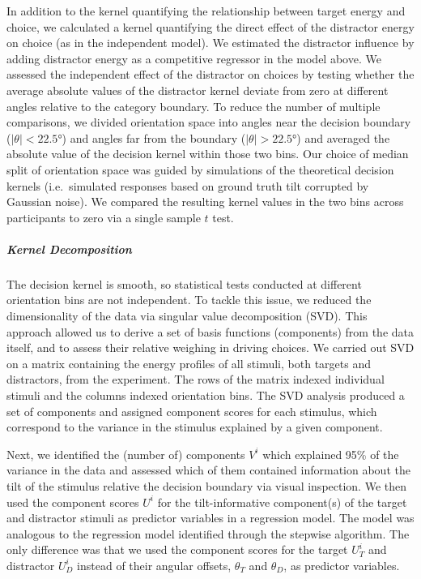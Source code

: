 \documentclass[a4paper, nobind]{templates/ociamthesis}
\begin{document}
In addition to the kernel quantifying the relationship between target energy and choice, we calculated a kernel quantifying the direct effect of the distractor energy on choice (as in the independent model). We estimated the distractor influence by adding distractor energy as a competitive regressor in the model above. We assessed the independent effect of the distractor on choices by testing whether the average absolute values of the distractor kernel deviate from zero at different angles relative to the category boundary. To reduce the number of multiple comparisons, we divided orientation space into angles near the decision boundary (\(|\theta|<22.5\)°) and angles far from the boundary (\(|\theta|>22.5\)°) and averaged the absolute value of the decision kernel within those two bins. Our choice of median split of orientation space was guided by simulations of the theoretical decision kernels (i.e.~simulated responses based on ground truth tilt corrupted by Gaussian noise). We compared the resulting kernel values in the two bins across participants to zero via a single sample \(t\) test.

\hypertarget{kernel-decomposition}{%
\subparagraph{Kernel Decomposition}\label{kernel-decomposition}}

The decision kernel is smooth, so statistical tests conducted at different orientation bins are not independent. To tackle this issue, we reduced the dimensionality of the data via singular value decomposition (SVD). This approach allowed us to derive a set of basis functions (components) from the data itself, and to assess their relative weighing in driving choices. We carried out SVD on a matrix containing the energy profiles of all stimuli, both targets and distractors, from the experiment. The rows of the matrix indexed individual stimuli and the columns indexed orientation bins. The SVD analysis produced a set of components and assigned component scores for each stimulus, which correspond to the variance in the stimulus explained by a given component.

Next, we identified the (number of) components \(V^i\) which explained 95\% of the variance in the data and assessed which of them contained information about the tilt of the stimulus relative the decision boundary via visual inspection. We then used the component scores \(U^i\) for the tilt-informative component(s) of the target and distractor stimuli as predictor variables in a regression model. The model was analogous to the regression model identified through the stepwise algorithm. The only difference was that we used the component scores for the target \(U_T^i\) and distractor \(U_D^i\) instead of their angular offsets, \(\theta_T\) and \(\theta_D\), as predictor variables.
\end{document}

